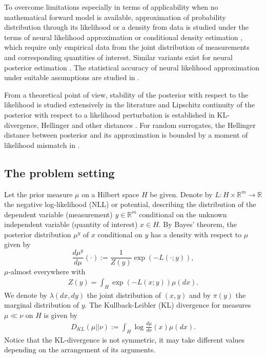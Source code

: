 \documentclass{amsart}
\theoremstyle{definition}
\newcommand{\R}{{\mathbb R}}
\newcommand{\KL}[2]{D_{KL}\left(#1 || #2\right)}
\newcommand{\todo}[1]{\textcolor{red}{[#1]}}
\begin{document}
To overcome limitations especially in terms of applicability when no mathematical forward model is available, approximation of probability distribution through its likelihood or a density from data is studied under the terms of neural likelihood approximation \cite{papamakarios2019sequantialneural, WALCHESSEN2024Neurallikelihood, lueckmann2019likelihoodfree, hikida2025multilevelneuralsimulationbasedinference} or conditional density estimation \cite{Papamakarios2016Fast,papamakarios2019neuraldensityestimationlikelihoodfree,rothfuss2019conditional}, which require only empirical data from the joint distribution of measurements and corresponding quantities of interest.
Similar variants exist for neural posterior estimation \cite{NEURIPS2022Truncatedproposals, hikida2025multilevelneuralsimulationbasedinference}.
The statistical accuracy of neural likelihood approximation under suitable assumptions are studied in \cite{frazier2024statisticalaccuracyneuralposterior}.




From a theoretical point of view, stability of the posterior with respect to the likelihood is studied extensively in the literature and Lipschitz continuity of the posterior with respect to a likelihood perturbation is established in KL-divergence, Hellinger and other distances \cite{Stuart_2010, Sprungk_2020, cvetković2025upperlowerboundslocal}. For random surrogates, the Hellinger distance between posterior and its approximation is bounded by a moment of likelihood mismatch in \cite{Lie2018RandomForward}.

\subsection{The problem setting}\label{ss:Setting}
Let the prior measure $\mu$ on a Hilbert space $H$ be given. Denote by $L: H \times\R^m \rightarrow \R$ the negative log-likelihood (NLL) or potential, describing the distribution of the dependent variable (measurement) $y \in \R^m$ conditional on the unknown independent variable (quantity of interest) $x \in H$.
By Bayes' theorem, the posterior distribution $\mu^y$ of $x$ conditional on $y$ has a density with respect to $\mu$ given by
\begin{equation}\label{eq: posterior corresponding to L}
    \frac{d \mu^y}{d \mu}(\cdot) :=\frac{1}{Z(y)} \exp \left( -L(\cdot; y) \right), 
\end{equation}
$\mu$-almost everywhere with
\begin{eqnarray*}
    Z(y) = \int_H \exp \left( -L(x; y) \right) \mu(dx).
\end{eqnarray*}
We denote by $\lambda(dx, dy)$ %
the joint distribution of $(x, y)$ and by $\pi(y)$ the marginal distribution of $y$.
The Kullback-Leibler (KL) divergence for measures $\mu \ll \nu$ on $H$ is given by
\begin{eqnarray*}
    \KL{\mu}{\nu} := \int_H \log \frac{d \mu}{ d \nu}(x) \mu(dx).
\end{eqnarray*}
Notice that the KL-divergence is not symmetric, it may take different values depending on the arrangement of its arguments.
\end{document}
